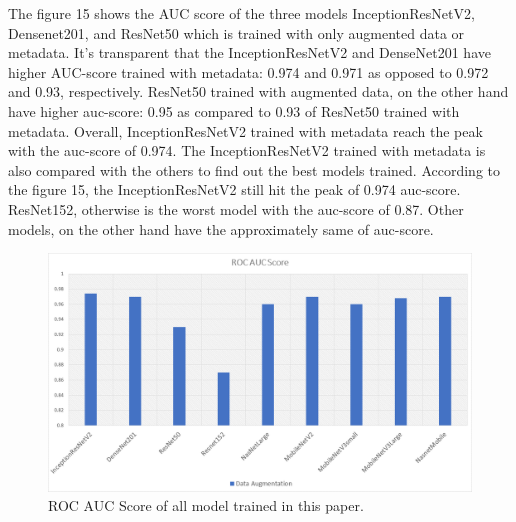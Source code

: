 \documentclass[sensors,article,submit,pdftex,moreauthors]{Definitions/mdpi}
\begin{document}
The figure 15 shows the AUC score of the three models InceptionResNetV2, Densenet201, and ResNet50 which is trained with only augmented data or metadata. It's transparent that the InceptionResNetV2 and DenseNet201 have higher AUC-score trained with metadata: 0.974 and 0.971 as opposed to 0.972 and 0.93, respectively. ResNet50 trained with augmented data, on the other hand have higher auc-score: 0.95 as compared to 0.93 of ResNet50 trained with metadata. Overall, InceptionResNetV2 trained with metadata reach the peak with the auc-score of 0.974. The InceptionResNetV2 trained with metadata is also compared with the others to find out the best models trained. According to the figure 15, the InceptionResNetV2 still hit the peak of 0.974 auc-score. ResNet152, otherwise is the worst model with the auc-score of 0.87. Other models, on the other hand have the approximately same of auc-score. 

\begin{figure}[H]
	\centering
	\includegraphics[width=1\linewidth]{Definitions/vsALL}
	\caption{ROC AUC Score of all model trained in this paper.}
	\label{fig:vsallAUC}
\end{figure}
\end{document}
